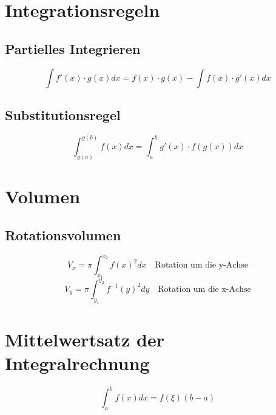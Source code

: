 \section{Integrationsregeln}
\subsection{Partielles Integrieren}
\[ \boxed{\int f'(x) \cdot g(x) dx = f(x) \cdot g(x) - \int f(x) \cdot g'(x) dx} \]
\subsection{Substitutionsregel}
\[ \boxed{\int_{g(a)}^{g(b)} f(x) dx = \int_{a}^{b} g'(x) \cdot f(g(x)) dx} \]


\section{Volumen}
\subsection{Rotationsvolumen}
\[ \boxed{V_x = \pi \int_{x_1}^{x_2} f(x)^2 dx} \quad \text{Rotation um die y-Achse}\]
\[ \boxed{V_y = \pi \int_{y_1}^{y_2} f^{-1}(y)^2 dy} \quad \text{Rotation um die x-Achse}\]

\section{Mittelwertsatz der Integralrechnung}
\[ \boxed{\int_{a}^{b} f(x) dx = f(\xi)(b-a)} \]
